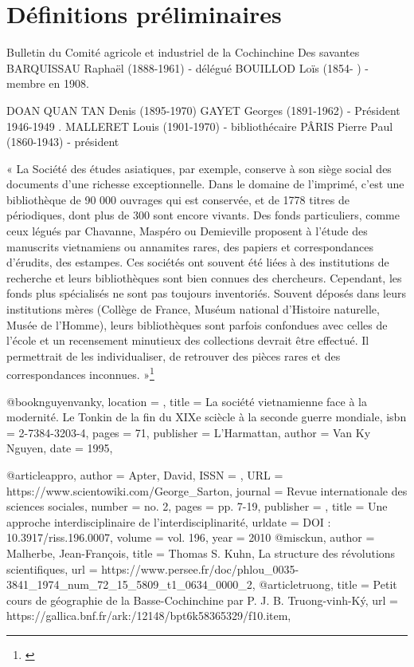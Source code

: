 \section{Définitions préliminaires}

Bulletin du Comité agricole et industriel de la Cochinchine
Des savantes 
BARQUISSAU Raphaël (1888-1961) - délégué
BOUILLOD Loïs (1854- ) - membre en 1908.

DOAN QUAN TAN Denis (1895-1970)
GAYET Georges (1891-1962) - Président 1946-1949
.
MALLERET Louis (1901-1970) - bibliothécaire
PÂRIS Pierre Paul (1860-1943) - président

« La Société des études asiatiques, par exemple, conserve à son siège social des documents d’une richesse exceptionnelle. Dans le domaine de l’imprimé, c’est une bibliothèque de 90 000 ouvrages qui est conservée, et de 1778 titres de périodiques, dont plus de 300 sont encore vivants. Des fonds particuliers, comme ceux légués par Chavanne, Maspéro ou Demieville proposent à l’étude des manuscrits vietnamiens ou annamites rares, des papiers et correspondances d’érudits, des estampes. Ces sociétés ont souvent été liées à des institutions de recherche et leurs bibliothèques sont bien connues des chercheurs. Cependant, les fonds plus spécialisés ne sont pas toujours inventoriés. Souvent déposés dans leurs institutions mères (Collège de France, Muséum national d’Histoire naturelle, Musée de l’Homme), leurs bibliothèques sont parfois confondues avec celles de l’école et un recensement minutieux des collections devrait être effectué. Il permettrait de les individualiser, de retrouver des pièces rares et des correspondances inconnues. »\footnote{\cite{ak}}


@book{nguyenvanky,
	location = {},
	title = {La société vietnamienne face à la modernité. Le Tonkin de la fin du XIXe sciècle à la seconde guerre mondiale},
	isbn = {2-7384-3203-4},
    pages = {71},
	publisher = {L'Harmattan},
	author = {Van Ky Nguyen},
	date = {1995},
}

@article{appro,
author = {Apter, David},
 ISSN = {},
 URL = {https://www.scientowiki.com/George_Sarton},
 journal = {Revue internationale des sciences sociales},
 number = {no. 2},
 pages = {pp. 7-19},
 publisher = {},
 title = {Une approche interdisciplinaire de l'interdisciplinarité},
 urldate = {DOI : 10.3917/riss.196.0007},
 volume = {vol. 196},
 year = {2010}
}
@misc{kun,
	author = {Malherbe, Jean-François},
	title = {{Thomas S. Kuhn, La structure des révolutions scientifiques}},
	url = {https://www.persee.fr/doc/phlou_0035-3841_1974_num_72_15_5809_t1_0634_0000_2},
}
@article{truong,
	title = {Petit cours de géographie de la Basse-Cochinchine par P. J. B. Truong-vinh-Ký},
	url = {https://gallica.bnf.fr/ark:/12148/bpt6k58365329/f10.item},
}

